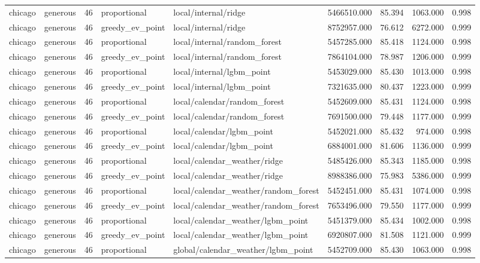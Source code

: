 \begin{tabular}{llrllrrrr}
chicago & generous & 46 & proportional & local/internal/ridge & 5466510.000 & 85.394 & 1063.000 & 0.998 \\
chicago & generous & 46 & greedy\_ev\_point & local/internal/ridge & 8752957.000 & 76.612 & 6272.000 & 0.999 \\
chicago & generous & 46 & proportional & local/internal/random\_forest & 5457285.000 & 85.418 & 1124.000 & 0.998 \\
chicago & generous & 46 & greedy\_ev\_point & local/internal/random\_forest & 7864104.000 & 78.987 & 1206.000 & 0.999 \\
chicago & generous & 46 & proportional & local/internal/lgbm\_point & 5453029.000 & 85.430 & 1013.000 & 0.998 \\
chicago & generous & 46 & greedy\_ev\_point & local/internal/lgbm\_point & 7321635.000 & 80.437 & 1223.000 & 0.999 \\
chicago & generous & 46 & proportional & local/calendar/random\_forest & 5452609.000 & 85.431 & 1124.000 & 0.998 \\
chicago & generous & 46 & greedy\_ev\_point & local/calendar/random\_forest & 7691500.000 & 79.448 & 1177.000 & 0.999 \\
chicago & generous & 46 & proportional & local/calendar/lgbm\_point & 5452021.000 & 85.432 & 974.000 & 0.998 \\
chicago & generous & 46 & greedy\_ev\_point & local/calendar/lgbm\_point & 6884001.000 & 81.606 & 1136.000 & 0.999 \\
chicago & generous & 46 & proportional & local/calendar\_weather/ridge & 5485426.000 & 85.343 & 1185.000 & 0.998 \\
chicago & generous & 46 & greedy\_ev\_point & local/calendar\_weather/ridge & 8988386.000 & 75.983 & 5386.000 & 0.999 \\
chicago & generous & 46 & proportional & local/calendar\_weather/random\_forest & 5452451.000 & 85.431 & 1074.000 & 0.998 \\
chicago & generous & 46 & greedy\_ev\_point & local/calendar\_weather/random\_forest & 7653496.000 & 79.550 & 1177.000 & 0.999 \\
chicago & generous & 46 & proportional & local/calendar\_weather/lgbm\_point & 5451379.000 & 85.434 & 1002.000 & 0.998 \\
chicago & generous & 46 & greedy\_ev\_point & local/calendar\_weather/lgbm\_point & 6920807.000 & 81.508 & 1121.000 & 0.999 \\
chicago & generous & 46 & proportional & global/calendar\_weather/lgbm\_point & 5452709.000 & 85.430 & 1063.000 & 0.998 \\

\end{tabular}
